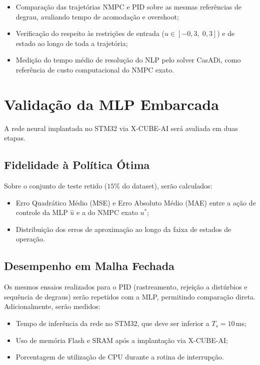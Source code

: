 \begin{itemize}
    \item Comparação das trajetórias NMPC e PID sobre as mesmas referências de degrau, avaliando tempo de acomodação e overshoot;
    \item Verificação do respeito às restrições de entrada ($u \in [-0{,}3,\; 0{,}3]$) e de estado ao longo de toda a trajetória;
    \item Medição do tempo médio de resolução do NLP pelo solver CasADi, como referência de custo computacional do NMPC exato.
\end{itemize}

\section{Validação da MLP Embarcada}

A rede neural implantada no STM32 via X-CUBE-AI será avaliada em duas etapas.

\subsection{Fidelidade à Política Ótima}

Sobre o conjunto de teste retido ($15\%$ do dataset), serão calculados:

\begin{itemize}
    \item Erro Quadrático Médio (MSE) e Erro Absoluto Médio (MAE) entre a ação de controle da MLP $\hat{u}$ e a do NMPC exato $u^*$;
    \item Distribuição dos erros de aproximação ao longo da faixa de estados de operação.
\end{itemize}

\subsection{Desempenho em Malha Fechada}

Os mesmos ensaios realizados para o PID (rastreamento, rejeição a  distúrbios e sequência de degraus) serão repetidos com a MLP, permitindo comparação direta. Adicionalmente, serão medidos:

\begin{itemize}
    \item Tempo de inferência da rede no STM32, que deve ser inferior a $T_s = 10$\,ms;
    \item Uso de memória Flash e SRAM após a implantação via X-CUBE-AI;
    \item Porcentagem de utilização de CPU durante a rotina de interrupção.
\end{itemize}

